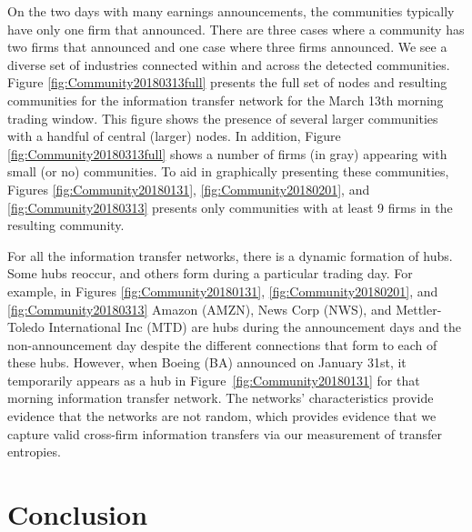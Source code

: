 On the two days with many earnings announcements,  the communities typically have only one firm that announced.  There are three cases where a community has two firms that announced and one case where three firms announced. We see a diverse set of industries connected within and across the detected communities.   Figure \ref{fig:Community20180313full} presents the full set of nodes and resulting communities for the information transfer network for the March 13th morning trading window. This figure shows the presence of several larger communities with a handful of central (larger) nodes. In addition, Figure \ref{fig:Community20180313full} shows a number of firms (in gray) appearing with small (or no) communities.   To aid in graphically presenting these communities, Figures \ref{fig:Community20180131},  \ref{fig:Community20180201}, and \ref{fig:Community20180313}  presents only communities with at least 9 firms in the resulting community.  

For all the information transfer networks, there is a dynamic formation of hubs.  Some hubs reoccur, and others form during a particular trading day.   For example,  in Figures \ref{fig:Community20180131},  \ref{fig:Community20180201}, and \ref{fig:Community20180313} Amazon (AMZN), News Corp (NWS), and Mettler-Toledo International Inc (MTD) are hubs during the announcement days and the non-announcement day despite the different connections that form to each of these hubs.  However, when Boeing (BA) announced on January 31st, it temporarily appears as a hub in Figure~\ref{fig:Community20180131} for that morning information transfer network. The networks' characteristics provide evidence that the networks are not random, which provides evidence that we capture valid cross-firm information transfers via our measurement of transfer entropies. 
 

\section{Conclusion}

